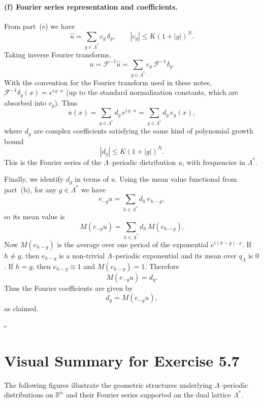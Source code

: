 \documentclass[12pt,a4paper]{article}
\theoremstyle{plain}
\theoremstyle{definition}
\theoremstyle{remark}
\theoremstyle{remark}
\begin{document}
	\bigskip
	
	
	\paragraph{(f) Fourier series representation and coefficients.}
	
	From part~(e) we have
	\[
	\widehat u = \sum_{g\in\Lambda^*} c_g\,\delta_g,
	\qquad |c_g|\le K(1+|g|)^N.
	\]
	Taking inverse Fourier transforms,
	\[
	u = \mathcal{F}^{-1}\widehat u
	= \sum_{g\in\Lambda^*} c_g\,\mathcal{F}^{-1}\delta_g.
	\]
	With the convention for the Fourier transform used in these notes,
	$\mathcal{F}^{-1}\delta_g(x) = e^{i\,g\cdot x}$ (up to the standard
	normalization constants, which are absorbed into $c_g$).  Thus
	\[
	u(x) = \sum_{g\in\Lambda^*} d_g\,e^{i\,g\cdot x}
	= \sum_{g\in\Lambda^*} d_g\,e_g(x),
	\]
	where $d_g$ are complex coefficients satisfying the same kind of
	polynomial growth bound
	\[
	|d_g| \le K(1+|g|)^N.
	\]
	This is the Fourier series of the $\Lambda$–periodic distribution $u$,
	with frequencies in $\Lambda^*$.
	
	Finally, we identify $d_g$ in terms of $u$.  Using the mean value
	functional from part~(b), for any $g\in\Lambda^*$ we have
	\[
	e_{-g}u = \sum_{h\in\Lambda^*} d_h\,e_{h-g},
	\]
	so its mean value is
	\[
	M(e_{-g}u)
	= \sum_{h\in\Lambda^*} d_h\,M(e_{h-g}).
	\]
	Now $M(e_{h-g})$ is the average over one period of the exponential
	$e^{i(h-g)\cdot x}$.  If $h\neq g$, then $e_{h-g}$ is a non-trivial
	$\Lambda$–periodic exponential and its mean over $q_\Lambda$ is $0$.
	If $h=g$, then $e_{h-g}\equiv 1$ and $M(e_{h-g})=1$.  Therefore
	\[
	M(e_{-g}u) = d_g.
	\]
	Thus the Fourier coefficients are given by
	\[
	d_g = M(e_{-g}u),
	\]
	as claimed.
	
	\hfill$\square$
	
	
	
	\section*{Visual Summary for Exercise 5.7}
	
	The following figures illustrate the geometric structures underlying
	$\Lambda$–periodic distributions on $\mathbb{R}^n$ and their Fourier
	series supported on the dual lattice $\Lambda^*$.
	
\end{document}
